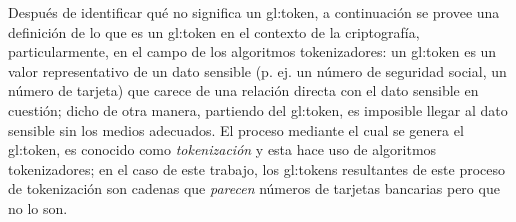 Después de identificar qué no significa un \gls{gl:token}, a continuación se
provee una definición de lo que es un \gls{gl:token} en el contexto de la
criptografía, particularmente, en el campo de los algoritmos tokenizadores: un
\gls{gl:token} es un valor representativo de un dato sensible (p. ej. un
número de seguridad social, un número de tarjeta) que carece de una relación
directa con el dato sensible en cuestión; dicho de otra manera, partiendo del
\gls{gl:token}, es imposible llegar al dato sensible sin los medios adecuados.
El proceso mediante el cual se genera el \gls{gl:token}, es conocido como
\textit{tokenización} y esta hace uso de algoritmos tokenizadores; en el caso
de este trabajo, los \glspl{gl:token} resultantes de este proceso de
tokenización son cadenas que \textit{parecen} números de tarjetas bancarias
pero que no lo son.
